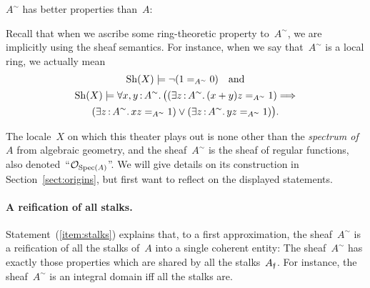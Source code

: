 \documentclass{ws-rv9x6}
\begin{document}
{\begin{center}
\vbox{$A^\sim$ has better properties than~$A$: \\[0.6em]
}
\end{center}

Recall that when we ascribe some ring-theoretic property to~$A^\sim$, we
are implicitly using the sheaf semantics. For instance, when we say
that~$A^\sim$ is a local ring, we actually mean
\begin{multline*}
  \mathrm{Sh}(X) \models \neg(1 =_{A^\sim} 0) \quad\text{and} \\
  \mathrm{Sh}(X) \models \forall x,y\,{:}\,A^\sim\mathpunct{.} \bigl((\exists z\,{:}\,A^\sim\mathpunct{.} (x + y)z
  =_{A^\sim} 1) \Longrightarrow \\
  (\exists
  z\,{:}\,A^\sim\mathpunct{.} xz =_{A^\sim} 1) \vee (\exists z\,{:}\,A^\sim\mathpunct{.} yz =_{A^\sim} 1)\bigr).
\end{multline*}

The locale~$X$ on which this theater plays out is none other than the
\emph{spectrum of~$A$} from algebraic geometry, and the sheaf~$A^\sim$ is the
sheaf of regular functions, also denoted~``$\mathcal{O}_{\mathrm{Spec}(A)}$''. We will give details on its construction in
Section~\ref{sect:origins}, but first want to reflect on the displayed
statements.

\paragraph{A reification of all stalks.}
Statement~(\ref{item:stalks}) explains that, to a first approximation, the
sheaf~$A^\sim$ is a reification of all the stalks of~$A$ into a single coherent
entity: The sheaf~$A^\sim$ has exactly those properties which are shared by all
the stalks~$A_{\mathfrak{f}}$. For instance, the sheaf~$A^\sim$ is an integral domain iff
all the stalks are.

}
\end{document}

